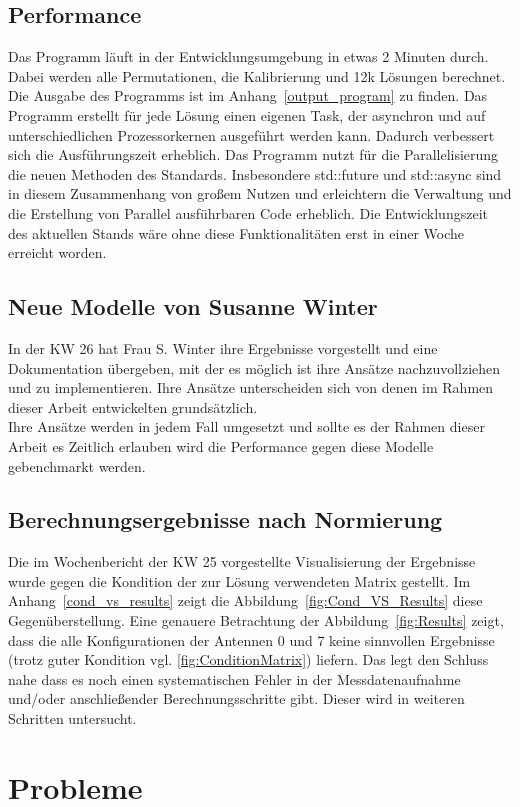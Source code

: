 \documentclass[a4paper,12pt,fleqn]{article}
\begin{document}
\subsection{Performance}
%
Das Programm läuft in der Entwicklungsumgebung in etwas 2 Minuten durch. Dabei werden alle Permutationen, die Kalibrierung und 12k Lösungen berechnet. Die Ausgabe des Programms ist im Anhang~\ref{output_program} zu finden. Das Programm erstellt für jede Lösung einen eigenen Task, der asynchron und auf unterschiedlichen Prozessorkernen ausgeführt werden kann. Dadurch verbessert sich die Ausführungszeit erheblich. Das Programm nutzt für die Parallelisierung die neuen Methoden des  Standards. Insbesondere std::future und std::async sind in diesem Zusammenhang von großem Nutzen und erleichtern die Verwaltung und die Erstellung von Parallel ausführbaren Code erheblich. Die Entwicklungszeit des aktuellen Stands wäre ohne diese Funktionalitäten erst in einer Woche erreicht worden.
%
\subsection{Neue Modelle von Susanne Winter}
%
In der KW 26 hat Frau S. Winter ihre Ergebnisse vorgestellt und eine Dokumentation \cite{WinAmed13} übergeben, mit der es möglich ist ihre Ansätze nachzuvollziehen und zu implementieren. Ihre Ansätze unterscheiden sich von denen im Rahmen dieser Arbeit entwickelten grundsätzlich.\\
Ihre Ansätze werden in jedem Fall umgesetzt und sollte es der Rahmen dieser Arbeit es Zeitlich erlauben wird die Performance gegen diese Modelle gebenchmarkt werden.
%
\subsection{Berechnungsergebnisse nach Normierung}
%
Die im Wochenbericht der KW 25 vorgestellte Visualisierung der Ergebnisse wurde gegen die Kondition der zur Lösung verwendeten Matrix gestellt. Im Anhang~\ref{cond_vs_results} zeigt die Abbildung~\ref{fig:Cond_VS_Results} diese Gegenüberstellung. Eine genauere Betrachtung der Abbildung~\ref{fig:Results} zeigt, dass die alle Konfigurationen der Antennen 0 und 7 keine sinnvollen Ergebnisse (trotz guter Kondition vgl. \ref{fig:ConditionMatrix}) liefern. Das legt den Schluss nahe dass es noch einen systematischen Fehler in der Messdatenaufnahme und/oder anschließender Berechnungsschritte gibt. Dieser wird in weiteren Schritten untersucht.
%
\section{Probleme}
\label{Problems}
%

%


\newpage


\end{document}

